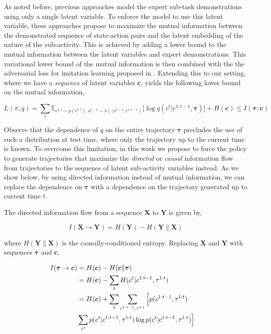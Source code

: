 \documentclass{article} %
\begin{document}
As noted before, previous approaches \citep{li2017infogail, hausman2017multi} model the expert sub-task demonstrations using only a single latent variable. To enforce the model to use this latent variable, these approaches propose to maximize the mutual information between the demonstrated sequence of state-action pairs and the latent embedding of the nature of the sub-activity. This is achieved by adding a lower bound to the mutual information between the latent variables and expert demonstrations. This variational lower bound of the mutual information is then combined with the the adversarial loss for imitation learning proposed in \cite{ho2016generative}. Extending this to our setting, where we have a \emph{sequence} of latent variables $\boldsymbol{c}$, yields the following lower bound on the mutual information,

\begin{equation}
 L(\pi, q) = \sum_{t} \mathbb{E}_{c^{1:t} \sim p(c^{1:t}), a^{t-1} \sim \pi(\cdot | s^{t-1},c^{1:t-1})} \Big[
 \log q(c^{t} | c^{1:t-1}, \boldsymbol{\tau}) \Big] + H(\boldsymbol{c}) \leq I(\boldsymbol{\tau}; \boldsymbol{c})
\end{equation}

Observe that the dependence of $q$ on the entire trajectory $\boldsymbol{\tau}$ precludes the use of such a distribution at test time, where only the trajectory up to the current time is known. To overcome this limitation, in this work we propose to force the policy to generate trajectories that maximize the \textit{directed} or \textit{causal} information flow from trajectories to the sequence of latent sub-activity variables instead. As we show below, by using directed information instead of mutual information, we can replace the dependence on $\boldsymbol{\tau}$ with a dependence on the trajectory generated up to current time $t$.

The directed information flow from a sequence $\boldsymbol{X}$ to $\boldsymbol{Y}$ is given by,

\begin{equation*}
I(\boldsymbol{X} \rightarrow \boldsymbol{Y}) = H(\boldsymbol{Y}) - H(\boldsymbol{Y} \| \boldsymbol{X})    
\end{equation*}

where $H(\boldsymbol{Y} \| \boldsymbol{X})$ is the causally-conditioned entropy. Replacing $\boldsymbol{X}$ and $\boldsymbol{Y}$ with sequences $\boldsymbol{\tau}$ and $\boldsymbol{c}$,

\begin{align}
\footnotesize
I(\boldsymbol{\tau} \rightarrow \boldsymbol{c}) &= H(\boldsymbol{c}) - H(\boldsymbol{c} \| \boldsymbol{\tau})& &\nonumber \\
&= H(\boldsymbol{c}) - \sum_{t}H(c^{t}|c^{1:t-1}, \tau^{1:t})& & \nonumber \\
&= H(\boldsymbol{c}) + \sum_{t} \sum_{c^{1:t-1}, \tau^{1:t}} \Big[ p(c^{1:t-1}, \tau^{1:t}) & &\nonumber \\
& \sum_{c^{t}} p(c^{t} | c^{1:t-1}, \tau^{1:t}) \log p(c^{t} | c^{1:t-1}, \tau^{1:t})\Big]  
\end{align}
\end{document}
